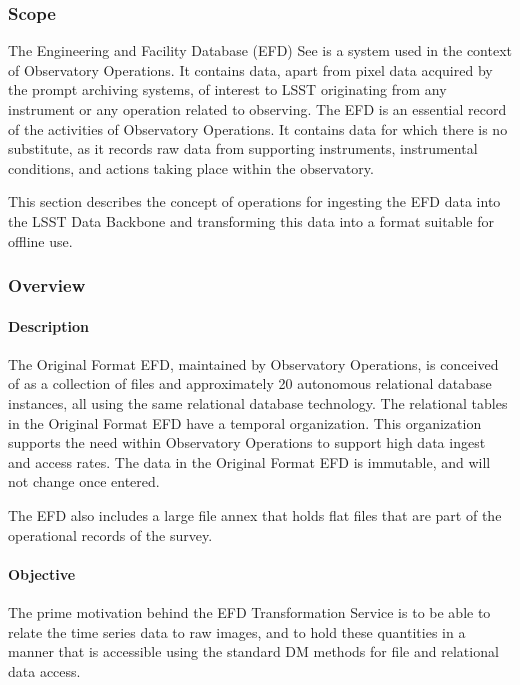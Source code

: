 \subsubsection{Scope}

The Engineering and Facility Database (EFD) See  is a system used in the
context of Observatory Operations. It contains data, apart from pixel
data acquired by the prompt archiving systems, of interest to LSST
originating from any instrument or any operation related to
observing. The EFD is an essential record of the activities of
Observatory Operations. It contains data for which there is no
substitute, as it records raw data from supporting instruments,
instrumental conditions, and actions taking place within the
observatory.

This section describes the concept of operations for ingesting the
EFD data into the LSST Data Backbone and transforming this data
into a format suitable for offline use.

\subsubsection{Overview}

\paragraph{Description}

The Original Format EFD, maintained by Observatory Operations, is
conceived of as a collection of files and approximately 20 autonomous
relational database instances, all using the same relational database
technology. The relational tables in the Original Format EFD have a
temporal organization. This organization supports the need within
Observatory Operations to support high data ingest and access
rates. The data in the Original Format EFD is immutable, and will not
change once entered.

The EFD also includes a large file annex that holds flat files that
are part of the operational records of the survey.

\paragraph{Objective}

The prime motivation behind the EFD Transformation Service is to be able to
relate the time series data to raw images, and to hold these quantities in
a manner that is accessible using the standard DM methods for file and
relational data access.

